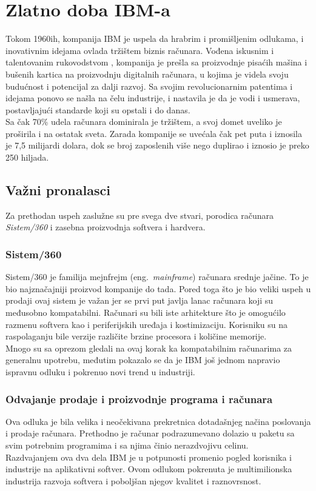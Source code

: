 \documentclass[a4paper]{article}
\begin{document}
\section{Zlatno doba IBM-a}%
Tokom 1960ih, kompanija IBM je uspela da hrabrim i promišljenim odlukama, i inovativnim idejama ovlada tržištem biznis računara. Vođena iskusnim i talentovanim rukovodstvom%
, kompanija je prešla sa proizvodnje pisaćih mašina i bušenih kartica na proizvodnju digitalnih računara, u kojima je videla svoju budućnost i potencijal za dalji razvoj.
Sa svojim revolucionarnim patentima i idejama ponovo se našla na čelu industrije, i nastavila je da je vodi i usmerava, postavljajući standarde koji su opstali i do danas.\\
Sa čak 70\% udela računara dominirala je tržištem, %
a svoj domet uveliko je proširila i na ostatak sveta. Zarada kompanije se uvećala čak pet puta i iznosila je 7,5 milijardi dolara, dok se broj zaposlenih više nego duplirao i iznosio je preko 250 hiljada. %
\subsection{Važni pronalasci} 
Za prethodan uspeh zaslužne su pre svega dve stvari, porodica računara \emph{Sistem/360}  i zasebna proizvodnja softvera i hardvera.
\subsubsection*{Sistem/360}Sistem/360 je familija mejnfrejm (eng.~{\em mainframe}) računara srednje jačine. To je bio najznačajniji proizvod kompanije do tada. Pored toga što je bio veliki uspeh u prodaji ovaj sistem je važan jer se prvi put javlja lanac računara koji su međusobno kompatabilni.
Računari su bili iste arhitekture što je omogućilo razmenu softvera kao i periferijskih uređaja i kostimizaciju. Korisniku su na raspolaganju bile verzije različite brzine procesora i količine memorije. \\%
Mnogo su sa oprezom gledali na ovaj korak ka kompatabilnim računarima za generalnu upotrebu, međutim pokazalo se da je IBM još jednom napravio ispravnu odluku i pokrenuo novi trend u industriji.%
\subsubsection*{Odvajanje prodaje i proizvodnje programa i računara} Ova odluka je bila velika i neočekivana prekretnica dotadašnjeg načina poslovanja i prodaje računara. Prethodno je računar podrazumevano dolazio u paketu sa svim potrebnim programima i sa njima činio nerazdvojivu celinu.\\
Razdvajanjem ova dva dela IBM je u potpunosti promenio pogled korisnika i industrije na aplikativni softver. Ovom odlukom pokrenuta je multimilionska industrija razvoja softvera i poboljšan njegov kvalitet i raznovrsnost. 
\end{document}
